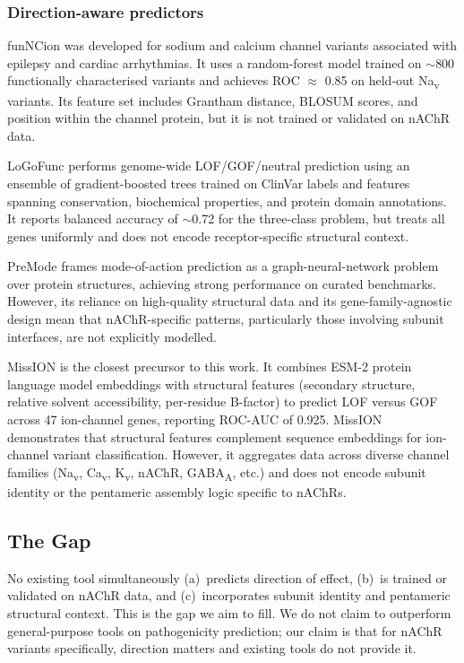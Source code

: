 \documentclass{ws-procs11x85}
\begin{document}
\subsubsection{Direction-aware predictors}

funNCion \cite{funncion} was developed for sodium and calcium channel
variants associated with epilepsy and cardiac arrhythmias. It uses a
random-forest model trained on $\sim$800 functionally characterised
variants and achieves ROC $\approx$ 0.85 on held-out Na\textsubscript{v}
variants. Its feature set includes Grantham distance, BLOSUM scores,
and position within the channel protein, but it is not trained or
validated on nAChR data.

LoGoFunc \cite{logofunc} performs genome-wide LOF/GOF/neutral prediction
using an ensemble of gradient-boosted trees trained on ClinVar labels
and features spanning conservation, biochemical properties, and
protein domain annotations. It reports balanced accuracy of $\sim$0.72
for the three-class problem, but treats all genes uniformly and does
not encode receptor-specific structural context.

PreMode \cite{premode} frames mode-of-action prediction as a
graph-neural-network problem over protein structures, achieving
strong performance on curated benchmarks. However, its reliance on
high-quality structural data and its gene-family-agnostic design mean
that nAChR-specific patterns, particularly those involving subunit
interfaces, are not explicitly modelled.

MissION \cite{mission} is the closest precursor to this work. It
combines ESM-2 protein language model embeddings with structural
features (secondary structure, relative solvent accessibility,
per-residue B-factor) to predict LOF versus GOF across 47 ion-channel
genes, reporting ROC-AUC of 0.925. MissION demonstrates that structural
features complement sequence embeddings for ion-channel variant
classification. However, it aggregates data across diverse channel
families (Na\textsubscript{v}, Ca\textsubscript{v}, K\textsubscript{v},
nAChR, GABA\textsubscript{A}, etc.) and does not encode subunit
identity or the pentameric assembly logic specific to nAChRs.

\subsection{The Gap}

No existing tool simultaneously (a)~predicts direction of effect,
(b)~is trained or validated on nAChR data, and (c)~incorporates
subunit identity and pentameric structural context. This is the gap
we aim to fill. We do not claim to outperform general-purpose tools
on pathogenicity prediction; our claim is that for nAChR variants
specifically, direction matters and existing tools do not provide it.
\end{document}
